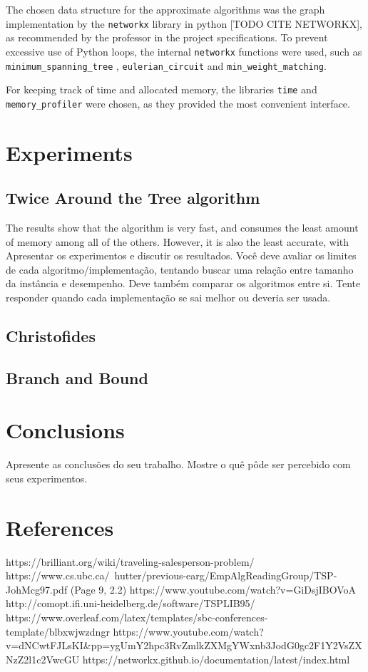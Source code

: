\documentclass[12pt]{article}
\begin{document}
The chosen data structure for the approximate algorithms was the graph implementation 
by the \texttt{networkx} library in python [TODO CITE NETWORKX], as recommended by 
the professor in the project specifications. To prevent excessive use of Python loops, 
the internal \texttt{networkx} functions were used, such as \texttt{minimum\_spanning\_tree} , 
\texttt{eulerian\_circuit} and \texttt{min\_weight\_matching}.

For keeping track of time and allocated memory, the libraries \texttt{time} and 
\texttt{memory\_profiler} were chosen, as they provided the most convenient interface.

\section{Experiments} \label{sec:firstpage}

\subsection{Twice Around the Tree algorithm}

The results show that the algorithm is very fast, and consumes the least amount
of memory among all of the others. However, it is also the least accurate, with
    Apresentar os experimentos e discutir os resultados. Você deve avaliar os
    limites de cada algoritmo/implementação, tentando buscar uma relação entre
    tamanho da instância e desempenho. Deve também comparar os algoritmos
    entre si. Tente responder quando cada implementação se sai melhor ou
    deveria ser usada.

\subsection{Christofides}

\subsection{Branch and Bound}


\section{Conclusions}
    Apresente as conclusões do seu trabalho. Mostre o quê pôde ser percebido
    com seus experimentos.

\section{References}

https://brilliant.org/wiki/traveling-salesperson-problem/
https://www.cs.ubc.ca/~hutter/previous-earg/EmpAlgReadingGroup/TSP-JohMcg97.pdf (Page 9, 2.2)
https://www.youtube.com/watch?v=GiDsjIBOVoA
http://comopt.ifi.uni-heidelberg.de/software/TSPLIB95/
https://www.overleaf.com/latex/templates/sbc-conferences-template/blbxwjwzdngr
https://www.youtube.com/watch?v=dNCwtFJLsKI&pp=ygUmY2hpc3RvZmlkZXMgYWxnb3JodG0gc2F1Y2VsZXNzZ2l1c2VwcGU%
https://networkx.github.io/documentation/latest/index.html



\end{document}
